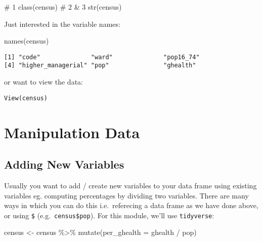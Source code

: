 \documentclass[
  letterpaper,
  krantz2]{style/krantz}
\newenvironment{Shaded}{\begin{snugshade}}{\end{snugshade}}
\newcommand{\AttributeTok}[1]{\textcolor[rgb]{0.40,0.45,0.13}{#1}}
\newcommand{\CommentTok}[1]{\textcolor[rgb]{0.37,0.37,0.37}{#1}}
\newcommand{\FunctionTok}[1]{\textcolor[rgb]{0.28,0.35,0.67}{#1}}
\newcommand{\NormalTok}[1]{\textcolor[rgb]{0.00,0.23,0.31}{#1}}
\newcommand{\OtherTok}[1]{\textcolor[rgb]{0.00,0.23,0.31}{#1}}
\newcommand{\SpecialCharTok}[1]{\textcolor[rgb]{0.37,0.37,0.37}{#1}}
\begin{document}
\begin{Shaded}
\begin{Highlighting}[]
\CommentTok{\# 1}
\FunctionTok{class}\NormalTok{(census)}
\CommentTok{\# 2 \& 3}
\FunctionTok{str}\NormalTok{(census)}
\end{Highlighting}
\end{Shaded}

Just interested in the variable names:

\begin{Shaded}
\begin{Highlighting}[]
\FunctionTok{names}\NormalTok{(census)}
\end{Highlighting}
\end{Shaded}

\begin{verbatim}
[1] "code"              "ward"              "pop16_74"         
[4] "higher_managerial" "pop"               "ghealth"          
\end{verbatim}

or want to view the data:

\texttt{View(census)}

\hypertarget{manipulation-data}{%
\section{Manipulation Data}\label{manipulation-data}}

\hypertarget{adding-new-variables}{%
\subsection{Adding New Variables}\label{adding-new-variables}}

Usually you want to add / create new variables to your data frame using
existing variables eg. computing percentages by dividing two variables.
There are many ways in which you can do this i.e.~referecing a data
frame as we have done above, or using \texttt{\$}
(e.g.~\texttt{census\$pop}). For this module, we'll use
\texttt{tidyverse}:

\begin{Shaded}
\begin{Highlighting}[]
\NormalTok{census }\OtherTok{\textless{}{-}}\NormalTok{ census }\SpecialCharTok{\%\textgreater{}\%} \FunctionTok{mutate}\NormalTok{(}\AttributeTok{per\_ghealth =}\NormalTok{ ghealth }\SpecialCharTok{/}\NormalTok{ pop)}
\end{Highlighting}
\end{Shaded}
\end{document}
